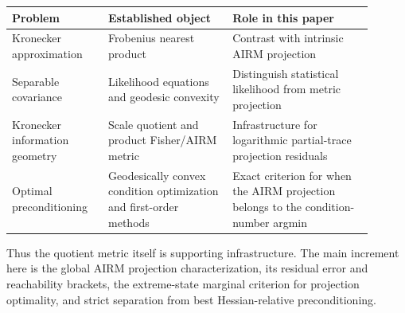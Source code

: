 \begin{center}
\small
\begin{tabular}{p{0.24\linewidth}p{0.31\linewidth}p{0.35\linewidth}}
\toprule
Problem & Established object & Role in this paper \\
\midrule
Kronecker approximation & Frobenius nearest product
\cite{vanloan1993kronecker} & Contrast with intrinsic AIRM projection \\
Separable covariance & Likelihood equations and geodesic convexity
\cite{dutilleul1999mle,wiesel2012kroneckerconvexity} & Distinguish statistical
likelihood from metric projection \\
Kronecker information geometry & Scale quotient and product Fisher/AIRM
metric \cite{mccormack2025kroneckergeometry} & Infrastructure for logarithmic
partial-trace projection residuals \\
Optimal preconditioning & Geodesically convex condition optimization and
first-order methods \cite{dogan2025geodesicpreconditioning} & Exact criterion
for when the AIRM projection belongs to the condition-number argmin \\
\bottomrule
\end{tabular}
\end{center}

Thus the quotient metric itself is supporting infrastructure.  The main
increment here is the global AIRM projection characterization, its residual
error and reachability brackets, the extreme-state marginal criterion for
projection optimality, and strict separation from best Hessian-relative
preconditioning.
